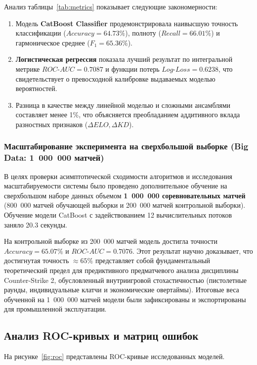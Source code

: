 \documentclass[14pt, a4paper]{extarticle}
\begin{document}
Анализ таблицы~\ref{tab:metrics} показывает следующие закономерности:
\begin{enumerate}
    \item Модель \textbf{CatBoost Classifier} продемонстрировала наивысшую точность классификации ($Accuracy = 64.73\%$), полноту ($Recall = 66.01\%$) и гармоническое среднее ($F_1 = 65.36\%$).
    \item \textbf{Логистическая регрессия} показала лучший результат по интегральной метрике $ROC\text{-}AUC = 0.7087$ и функции потерь $Log\text{-}Loss = 0.6238$, что свидетельствует о превосходной калибровке выдаваемых моделью вероятностей.
    \item Разница в качестве между линейной моделью и сложными ансамблями составляет менее 1\%, что объясняется преобладанием аддитивного вклада разностных признаков ($\Delta ELO, \Delta KD$).
\end{enumerate}

\subsubsection*{Масштабирование эксперимента на сверхбольшой выборке (Big Data: 1~000~000 матчей)}

В целях проверки асимптотической сходимости алгоритмов и исследования масштабируемости системы было проведено дополнительное обучение на сверхбольшом наборе данных объемом \textbf{1~000~000 соревновательных матчей} (800~000 матчей обучающей выборки и 200~000 матчей контрольной выборки). Обучение модели CatBoost с задействованием 12 вычислительных потоков заняло 20.3 секунды.

На контрольной выборке из 200~000 матчей модель достигла точности \textbf{$Accuracy = 65.07\%$} и \textbf{$ROC\text{-}AUC = 0.7076$}. Этот результат научно доказывает, что достигнутая точность $\approx 65\%$ представляет собой фундаментальный теоретический предел для предиктивного предматчевого анализа дисциплины Counter-Strike 2, обусловленный внутриигровой стохастичностью (пистолетные раунды, индивидуальные клатчи и экономические овертаймы). Итоговые веса обученной на 1~000~000 матчей модели были зафиксированы и экспортированы для промышленной эксплуатации.

\subsection{Анализ ROC-кривых и матриц ошибок}

На рисунке~\ref{fig:roc} представлены ROC-кривые исследованных моделей.
\end{document}
